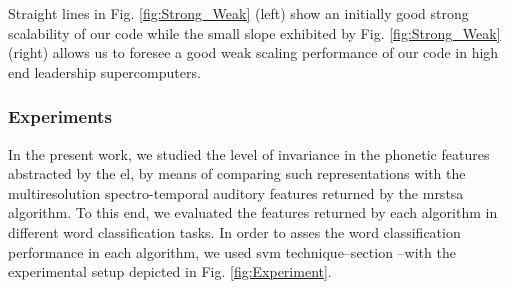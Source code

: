 \documentclass[10pt,letterpaper]{article}
\begin{document}







Straight lines in Fig. \ref{fig:Strong_Weak} (left) show an initially good strong scalability of our code while the small slope exhibited by Fig. \ref{fig:Strong_Weak} (right) allows us to foresee a good weak scaling performance of our code in high end leadership supercomputers.











\subsubsection*{Experiments}

In the present work, we studied the level of invariance in the phonetic features abstracted by the \gls{el}, by means of comparing such representations with the multiresolution spectro-temporal auditory features returned by the \gls{mrstsa} algorithm. To this end, we evaluated the features returned by each algorithm in different word classification tasks. In order to asses the word classification performance in each algorithm, we used \gls{svm} technique--section --with  the experimental setup depicted in Fig. \ref{fig:Experiment}.
\end{document}
